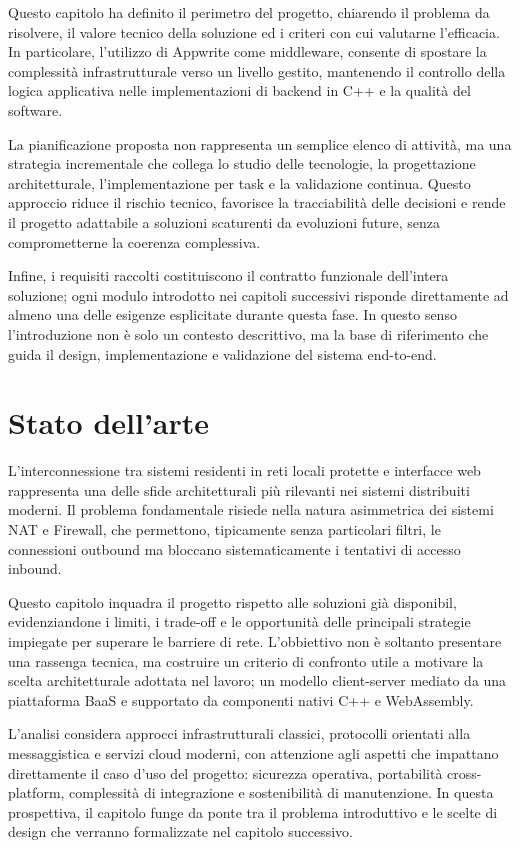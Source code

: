 \documentclass[a4paper, 11pt, twoside]{report}
\begin{document}
Questo capitolo ha definito il perimetro del progetto, chiarendo il problema da risolvere, il valore tecnico della
soluzione ed i criteri con cui valutarne l'efficacia. In particolare, l'utilizzo di Appwrite come middleware, consente
di spostare la complessità infrastrutturale verso un livello gestito, mantenendo il controllo della logica applicativa
nelle implementazioni di backend in C++ e la qualità del software.

La pianificazione proposta non rappresenta un semplice elenco di attività, ma una strategia incrementale che collega
lo studio delle tecnologie, la progettazione architetturale, l'implementazione per task e la validazione continua.
Questo approccio riduce il rischio tecnico, favorisce la tracciabilità delle decisioni e rende il progetto adattabile
a soluzioni scaturenti da evoluzioni future, senza comprometterne la coerenza complessiva.

Infine, i requisiti raccolti costituiscono il contratto funzionale dell'intera soluzione; ogni modulo introdotto nei
capitoli successivi risponde direttamente ad almeno una delle esigenze esplicitate durante questa fase. In questo
senso l'introduzione non è solo un contesto descrittivo, ma la base di riferimento che guida il design, implementazione
e validazione del sistema end-to-end.

\chapter{Stato dell'arte}

L'interconnessione tra sistemi residenti in reti locali protette e interfacce web rappresenta una delle sfide
architetturali più rilevanti nei sistemi distribuiti moderni. Il problema fondamentale risiede nella natura asimmetrica
dei sistemi \gls{NAT} e \gls{Firewall}, che permettono, tipicamente senza particolari filtri, le connessioni \gls{outbound}
ma bloccano sistematicamente i tentativi di accesso \gls{inbound}.

Questo capitolo inquadra il progetto rispetto alle soluzioni già disponibil, evidenziandone i limiti, i trade-off e le
opportunità delle principali strategie impiegate per superare le barriere di rete. L'obbiettivo non è soltanto presentare
una rassenga tecnica, ma costruire un criterio di confronto utile a motivare la scelta architetturale adottata nel lavoro;
un modello client-server mediato da una piattaforma BaaS e supportato da componenti nativi C++ e WebAssembly.

L'analisi considera approcci infrastrutturali classici, protocolli orientati alla messaggistica e servizi cloud moderni,
con attenzione agli aspetti che impattano direttamente il caso d'uso del progetto: sicurezza operativa, portabilità
cross-platform, complessità di integrazione e sostenibilità di manutenzione. In questa prospettiva, il capitolo funge da
ponte tra il problema introduttivo e le scelte di design che verranno formalizzate nel capitolo successivo.
\end{document}
